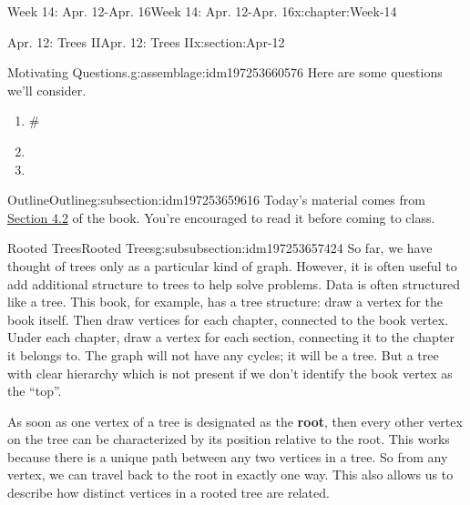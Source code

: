 \documentclass[oneside,10pt,]{book}
\newcommand{\terminology}[1]{\textbf{#1}}
\numberwithin{equation}{section}
\begin{document}
\begin{chapterptx}{Week 14: Apr. 12-Apr. 16}{}{Week 14: Apr. 12-Apr. 16}{}{}{x:chapter:Week-14}
%
%
\typeout{************************************************}
\typeout{************************************************}
%
\begin{sectionptx}{Apr. 12: Trees II}{}{Apr. 12: Trees II}{}{}{x:section:Apr-12}
\begin{introduction}{}%
\begin{assemblage}{Motivating Questions.}{g:assemblage:idm197253660576}%
Here are some questions we'll consider. %
\begin{enumerate}
\item{}\#%
\item{}%
\item{}%
\end{enumerate}
%
\end{assemblage}
\end{introduction}%
%
%
\typeout{************************************************}
\typeout{************************************************}
%
\begin{subsectionptx}{Outline}{}{Outline}{}{}{g:subsection:idm197253659616}
Today's material comes from \href{http://discrete.openmathbooks.org/dmoi3/sec_trees.html}{Section 4.2} of the book. You're encouraged to read it before coming to class.%
%
%
\typeout{************************************************}
\typeout{************************************************}
%
\begin{subsubsectionptx}{Rooted Trees}{}{Rooted Trees}{}{}{g:subsubsection:idm197253657424}
%
%
So far, we have thought of trees only as a particular kind of graph. However, it is often useful to add additional structure to trees to help solve problems. Data is often structured like a tree. This book, for example, has a tree structure: draw a vertex for the book itself. Then draw vertices for each chapter, connected to the book vertex. Under each chapter, draw a vertex for each section, connecting it to the chapter it belongs to. The graph will not have any cycles; it will be a tree. But a tree with clear hierarchy which is not present if we don't identify the book vertex as the ``top''.%
\par
{} As soon as one vertex of a tree is designated as the \terminology{root}, then every other vertex on the tree can be characterized by its position relative to the root.  This works because there is a unique path between any two vertices in a tree.  So from any vertex, we can travel back to the root in exactly one way.  This also allows us to describe how distinct vertices in a rooted tree are related.%

\end{subsubsectionptx}
\end{subsectionptx}
\end{sectionptx}
\end{chapterptx}
\end{document}
